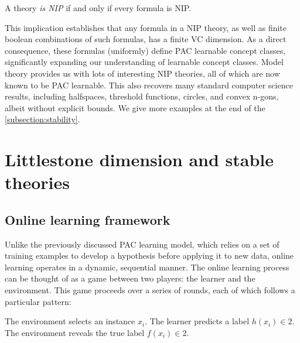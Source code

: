
\begin{definition}
    A theory \emph{is NIP} if and only if every formula is NIP. 
\end{definition}

This implication establishes that any formula in a NIP theory, as well as finite boolean combinations of such formulas, has a finite VC dimension. As a direct consequence, these formulas (uniformly) define PAC learnable concept classes, significantly expanding our understanding of learnable concept classes. Model theory provides us with lots of interesting NIP theories, all of which are now known to be PAC learnable. This also recovers many standard computer science results, including halfspaces, threshold functions, circles, and convex n-gons, albeit without explicit bounds. We give more examples at the end of the \cref{subsection:stability}.

\newpage 

\section{Littlestone dimension and stable theories}

\subsection{Online learning framework}

Unlike the previously discussed PAC learning model, which relies on a set of training examples to develop a hypothesis before applying it to new data, online learning operates in a dynamic, sequential manner. The online learning process can be thought of as a game between two players: the learner and the environment. This game proceeds over a series of rounds, each of which follows a particular pattern:

\begin{outline}
    \1[1)] The environment selects an instance $x_i$.
    \1[2)] The learner predicts a label $h(x_i)\in 2$.
    \1[3)] The environment reveals the true label $f(x_i)\in 2$.
\end{outline}

